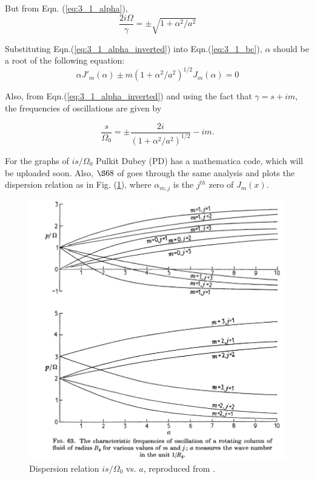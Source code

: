 But from Eqn. (\ref{eq:3_1_alpha}), 
\begin{equation}\label{eq:3_1_alpha_inverted}
 \frac{2i\Omega}{\gamma} = \pm \sqrt{1 + \alpha^{2}/a^{2}} 
\end{equation}

Substituting Eqn.(\ref{eq:3_1_alpha_inverted}) into Eqn.(\ref{eq:3_1_bc}), $\alpha$ should be a root of the following equation:
\begin{equation}
 \alpha J'_{m}(\alpha) \pm m (1 +  \alpha^{2}/a^{2})^{1/2} J_{m}(\alpha) = 0
\end{equation}

Also, from Eqn.(\ref{eq:3_1_alpha_inverted}) and using the fact that $\gamma = s + im$, the frequencies of oscillations are given by

\begin{equation}\label{eq:3_1_freq_of_oscillations}
 \boxed{\frac{s}{\Omega_{0}} = \pm \frac{2i}{(1 +  \alpha^{2}/a^{2})^{1/2}} - im}.
\end{equation}

For the graphs of $is/\Omega_{0}$ Pulkit Dubey (PD) has a mathematica code, which will be uploaded soon. Also, $\S 68$ of \cite{chandrasekhar1961hydrodynamic} goes through the same analysis and plots the dispersion relation as in Fig. (\ref{fig:rotating_col_dispersion_chandra}), where $\alpha_{m, j}$ is the $j^{th}$ zero of $J_{m}(x)$.

 \begin{figure}[H]
    \centering
    \includegraphics[scale = 0.4]{Figs/rotating_col_dispersion_chandra.png}
    \caption{Dispersion relation $is/\Omega_{0}$ vs. $a$, reproduced from \cite{chandrasekhar1961hydrodynamic}.}
    \label{fig:rotating_col_dispersion_chandra}
\end{figure}
